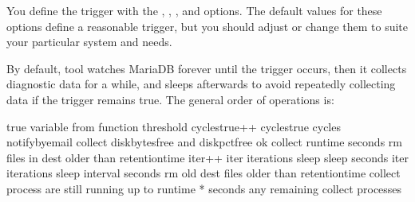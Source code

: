 \documentclass[letterpaper,10pt,english]{sphinxmanual}
\begin{document}
You define the trigger with the {\hyperref[\detokenize{mariadb-stat:cmdoption-mariadb-stat-function}]{}}, {\hyperref[\detokenize{mariadb-stat:cmdoption-mariadb-stat-variable}]{}},
{\hyperref[\detokenize{mariadb-stat:cmdoption-mariadb-stat-threshold}]{}}, and {\hyperref[\detokenize{mariadb-stat:cmdoption-mariadb-stat-cycles}]{}} options.  The default values
for these options define a reasonable trigger, but you should adjust
or change them to suite your particular system and needs.

By default,  tool watches MariaDB forever until the trigger occurs,
then it collects diagnostic data for a while, and sleeps afterwards to avoid
repeatedly collecting data if the trigger remains true.  The general order of
operations is:

\begin{sphinxVerbatim}[commandchars=\\\{\}]
 true 
    \PYGZhy{}\PYGZhy{}variable from \PYGZhy{}\PYGZhy{}function \PYGZgt{} \PYGZhy{}\PYGZhy{}threshold 
      cycles\PYGZus{}true++
       cycles\PYGZus{}true \PYGZgt{} \PYGZhy{}\PYGZhy{}cycles 
         \PYGZhy{}\PYGZhy{}notify\PYGZhy{}by\PYGZhy{}email
          \PYGZhy{}\PYGZhy{}collect 
             \PYGZhy{}\PYGZhy{}disk\PYGZhy{}bytes\PYGZhy{}free and \PYGZhy{}\PYGZhy{}disk\PYGZhy{}pct\PYGZhy{}free ok 
               \PYGZhy{}\PYGZhy{}collect  \PYGZhy{}\PYGZhy{}run\PYGZhy{}time seconds 
            rm files in \PYGZhy{}\PYGZhy{}dest older than \PYGZhy{}\PYGZhy{}retention\PYGZhy{}time
         iter++
       iter \PYGZlt{} \PYGZhy{}\PYGZhy{}iterations 
         sleep \PYGZhy{}\PYGZhy{}sleep seconds
       iter \PYGZlt{} \PYGZhy{}\PYGZhy{}iterations 
         sleep \PYGZhy{}\PYGZhy{}interval seconds
rm old \PYGZhy{}\PYGZhy{}dest files older than \PYGZhy{}\PYGZhy{}retention\PYGZhy{}time
 \PYGZhy{}\PYGZhy{}collect process are still running 
    up to \PYGZhy{}\PYGZhy{}run\PYGZhy{}time *  seconds
    any remaining \PYGZhy{}\PYGZhy{}collect processes
\end{sphinxVerbatim}
\end{document}
